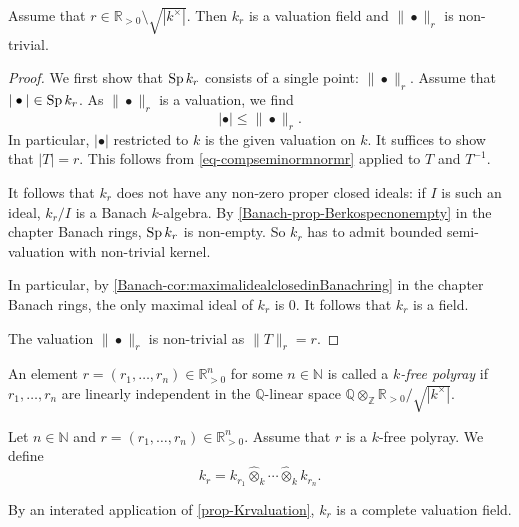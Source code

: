 \begin{proposition}\label{prop-Krvaluation}
    Assume that $r\in \mathbb{R}_{>0}\setminus \sqrt{|k^{\times}|}$. Then $k_r$ is a valuation field and $\|\bullet\|_r$ is non-trivial.
\end{proposition}
\begin{proof}
    We first show that $\operatorname{Sp} k_r$ consists of a single point: $\|\bullet\|_r$. Assume that $|\bullet|\in \operatorname{Sp} k_r$. As $\|\bullet\|_r$ is a valuation, we find 
    \begin{equation}\label{eq-compseminormnormr}
      |\bullet|\leq \|\bullet\|_r.  
    \end{equation}
    In particular, $|\bullet|$ restricted to $k$ is the given valuation on $k$. It suffices to show that $|T|=r$. This follows from \eqref{eq-compseminormnormr} applied to $T$ and $T^{-1}$.

    It follows that $k_r$ does not have any non-zero proper closed ideals: if $I$ is such an ideal, $k_r/I$ is a Banach $k$-algebra. By \cref{Banach-prop-Berkospecnonempty} in the chapter Banach rings, $\operatorname{Sp} k_r$ is non-empty. So $k_r$ has to admit bounded semi-valuation with non-trivial kernel.

    In particular, by \cref{Banach-cor:maximalidealclosedinBanachring} in the chapter Banach rings, the only maximal ideal of $k_r$ is $0$. It follows that $k_r$ is a field.

    The valuation $\|\bullet\|_r$ is non-trivial as $\|T\|_r=r$.
\end{proof}

\begin{definition}\label{def-kfreekr}
    An element $r=(r_1,\ldots,r_n)\in \mathbb{R}^n_{>0}$ for some $n\in \mathbb{N}$ is called a \emph{$k$-free polyray} if $r_1,\ldots,r_n$ are linearly independent in the $\mathbb{Q}$-linear space $\mathbb{Q}\otimes_{\mathbb{Z}}\mathbb{R}_{>0}/\sqrt{|k^{\times}|}$.

    Let $n\in \mathbb{N}$ and $r=(r_1,\ldots,r_n)\in \mathbb{R}^n_{>0}$. Assume that $r$ is a $k$-free polyray. We define 
    \[
        k_r=k_{r_1}\hat{\otimes}_k \cdots \hat{\otimes}_k k_{r_n}.  
    \]
\end{definition}
By an interated application of \cref{prop-Krvaluation}, $k_r$ is a complete valuation field.

